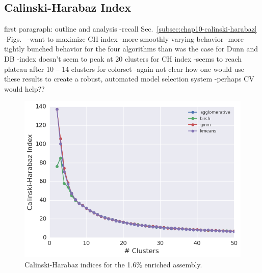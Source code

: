 \clearpage

\subsection{Calinski-Harabaz Index}
\label{subsec:chap11-ch-index}

first paragraph: outline and analysis
-recall Sec.~\ref{subsec:chap10-calinski-harabaz}
-Figs.~
-want to maximize CH index
-more smoothly varying behavior
-more tightly bunched behavior for the four algorithms than was the case for Dunn and DB
-index doesn't seem to peak at 20 clusters for CH index
-seems to reach plateau after 10 -- 14 clusters for colorset
-again not clear how one would use these results to create a robust, automated model selection system
  -perhaps CV would help??

\begin{figure}[h!]
\centering
\includegraphics[width=0.87\linewidth]{figures/results/model-select/assm-16/ch-combined-U238-capture-1}
\vspace{2mm}
\caption[Calinski-Harabaz indices for the 1.6\% enriched assembly]{Calinski-Harabaz indices for the 1.6\% enriched assembly.}
\label{fig:chap11-assm-16-ch-index}
\end{figure}

